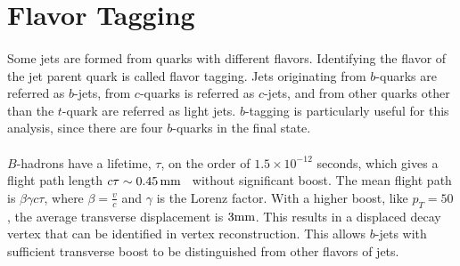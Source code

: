 \section{Flavor Tagging}
\label{sec:btag_70wp}
\paragraph{}
Some jets are formed from quarks with different flavors. 
Identifying the flavor of the jet parent quark is called flavor tagging. 
Jets originating from $b$-quarks are referred as $b$-jets, from $c$-quarks is referred as $c$-jets, and from other quarks other than the $t$-quark are referred as light jets.
$b$-tagging is particularly useful for this analysis, since there are four $b$-quarks in the final state.

\paragraph{}
$B$-hadrons have a lifetime, $\tau$, on the order of $1.5 \times 10^{-12}$ seconds, which gives a flight path length $c\tau \sim 0.45\,\rm mm$~\cite{Pdg} without significant boost.
The mean flight path is $\beta\gamma c\tau$, where $\beta=\frac{v}{c}$ and $\gamma$ is the Lorenz factor.
With a higher boost, like $p_T = 50$ \GeV, the average transverse displacement is $3\rm mm$.
This results in a displaced decay vertex that can be identified in vertex reconstruction. 
This allows $b$-jets with sufficient transverse boost to be distinguished from other flavors of jets.


